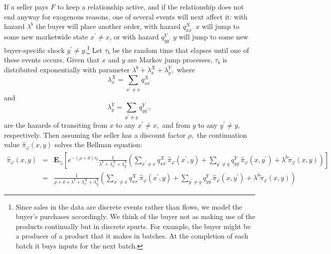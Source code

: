 If a seller pays $F$ to keep a relationship active, and if the relationship
does not end anyway for exogenous reasons, one of several events will next
affect it: with hazard $\lambda ^{b}$ the buyer will place another order,
with hazard $q_{xx^{\prime }}^{X}$ $x$ will jump to some new marketwide
state $x^{\prime }\neq x$, or with hazard $q_{yy^{\prime }}^{Y}$ $y$ will
jump to some new buyer-specific shock $y^{\prime }\neq y$.\footnote{ Since sales in the data are discrete events rather than flows, we model the
buyer's purchases accordingly. We think of the buyer not as making use of
the products continually but in discrete spurts. For example, the buyer
might be a producer of a product that it makes in batches. At the completion
of each batch it buys inputs for the next batch.\medskip} Let $\tau _{b}$ be
the random time that elapses until one of these events occurs. Given that $x$
and $y$ are Markov jump processes, $\tau _{b}$ is distributed exponentially
with parameter $\lambda ^{b}+\lambda _{x}^{X}+\lambda _{y}^{Y}, $ where%
\begin{equation}
\lambda _{x}^{X}=\sum_{x^{\prime }\neq x}q_{xx^{\prime }}^{X}  \label{q_K}
\end{equation}%
and%
\begin{equation}
\lambda _{y}^{Y}=\sum_{y^{\prime }\neq y}q_{yy^{\prime }}^{Y},  \label{q_Y}
\end{equation}%
are the hazards of transiting from $x$ to any $x^{\prime }\neq x,$ and from $%
y$ to any $y^{\prime }\neq y,$ respectively. Then assuming the seller has a
discount factor $\rho ,$ the continuation value $\widehat{\pi }_{\varphi
}(x,y)$ solves the Bellman equation:%
\begin{eqnarray*}
\widehat{\pi }_{\varphi }(x,y) &=&\mathbf{E}_{\tau _{b}}\left[ e^{-(\rho
+\delta )\tau _{b}}\frac{1}{\lambda ^{b}+\lambda _{x}^{X}+\lambda _{y}^{Y}}%
\left( \sum_{x^{\prime }\neq x}q_{xx^{\prime }}^{X}\widehat{\pi }_{\varphi
}(x^{\prime },y)+\sum_{y^{\prime }\neq y}q_{yy^{\prime }}^{Y}\widehat{\pi }%
_{\varphi }(x,y^{\prime })+\lambda ^{b}\widetilde{\pi }_{\varphi
}(x,y)\right) \right] \\
&=&\frac{1}{\rho +\delta +\lambda ^{b}+\lambda _{x}^{X}+\lambda _{y}^{Y}}%
\left( \sum_{x^{\prime }\neq x}q_{xx^{\prime }}^{X}\widehat{\pi }_{\varphi
}(x^{\prime },y)+\sum_{y^{\prime }\neq y}q_{yy^{\prime }}^{Y}\widehat{\pi }%
_{\varphi }(x,y^{\prime })+\lambda ^{b}\widetilde{\pi }_{\varphi
}(x,y)\right)
\end{eqnarray*}

